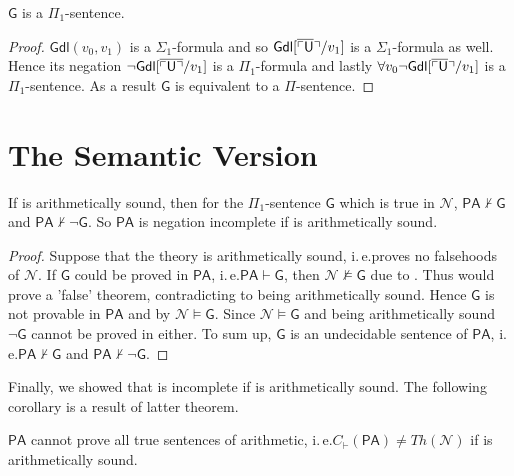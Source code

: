 \begin{prop}
$\mathsf{G}$ is a $\Pi_1$-sentence.
\end{prop}
\begin{proof}
$\mathsf{Gdl}(v_0,v_1)$ is a $\Sigma_1$-formula and so $\mathsf{Gdl}[\overline{\ulcorner \mathsf{U}} \urcorner /v_1]$ is a $\Sigma_1$-formula as well. Hence its negation $\lnot\mathsf{Gdl}[\overline{\ulcorner \mathsf{U} \urcorner }/v_1]$ is a $\Pi_1$-formula and lastly $\forall v_0  \lnot\mathsf{Gdl}[\overline{\ulcorner \mathsf{U}} \urcorner /v_1]$ is a $\Pi_1$-sentence. As a result $\mathsf{G}$ is equivalent to a $\Pi$-sentence.
\end{proof}

\section{The Semantic Version}

\begin{thm} \label{thm:semanticPA}
If \PA is arithmetically sound, then for the $\Pi_1$-sentence $\mathsf{G}$ which is true in $\mathcal{N}$, $\mathsf{PA} \nvdash \mathsf{G}$ and $\mathsf{PA} \nvdash \lnot \mathsf{G}$. So $\mathsf{PA}$ is negation incomplete if \PA is arithmetically sound.
\end{thm}

\begin{proof}
Suppose that the theory \PA is arithmetically sound, i.\,e.\@ \PA proves no falsehoods of $\mathcal{N}$. If $\mathsf{G}$ could be proved in $\mathsf{PA}$, i.\,e.\@ $\mathsf{PA} \vdash \mathsf{G}$, then $\mathcal{N} \nvDash \mathsf{G}$ due to . Thus \PA would prove a 'false' theorem, contradicting to \PA being arithmetically sound. Hence $\mathsf{G}$ is not provable in $\mathsf{PA}$ and by  $\mathcal{N} \vDash \mathsf{G}$. Since $\mathcal{N} \vDash \mathsf{G}$ and \PA being  arithmetically sound $\lnot \mathsf{G}$ cannot be proved in \PA either. To sum up, $\mathsf{G}$ is an undecidable sentence of $\mathsf{PA}$, i.\,e.\@ $\mathsf{PA} \nvdash \mathsf{G}$ and $\mathsf{PA} \nvdash \lnot \mathsf{G}$.
\end{proof}

Finally, we showed that \PA is incomplete if \PA is arithmetically sound. The following corollary is a result of latter theorem.

\begin{cor}
$\mathsf{PA}$ cannot prove all true sentences of arithmetic, i.\,e.\@ $C_\vdash(\mathsf{PA})\neq\mathit{Th}(\mathcal{N})$ if \PA is arithmetically sound.
\end{cor}

